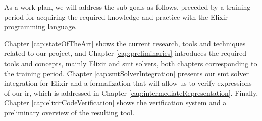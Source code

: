 As a work plan, we will address the sub-goals as follows, preceded by a training
period for acquiring the required knowledge and practice with the Elixir
programming language.

Chapter \ref{cap:stateOfTheArt} shows the current research, tools and techniques
related to our project, and Chapter \ref{cap:preliminaries} introduces the
required tools and concepts, mainly Elixir and \acrshort{smt} solvers, both
chapters corresponding to the training period. Chapter
\ref{cap:smtSolverIntegration} presents our \acrshort{smt} solver integration
for Elixir and a formalization that will allow us to verify expressions of our
\gls{ir}, which is addressed in Chapter \ref{cap:intermediateRepresentation}.
Finally, Chapter \ref{cap:elixirCodeVerification} shows the verification system
and a preliminary overview of the resulting tool.
